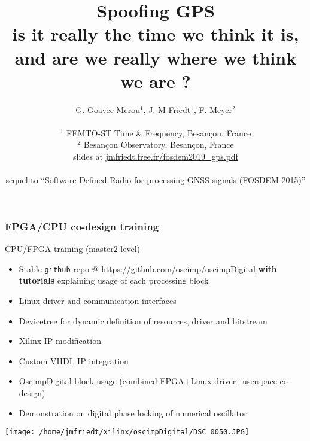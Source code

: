 \documentclass[compress,10pt]{beamer}
\title[FPGA]{Spoofing GPS \\
{
is it really the time we think it is, and are we really where we think we 
are ?}
 \vspace{0.2cm}}
\author[]{G. Goavec-Merou$^1$, J.-M Friedt$^1$, F. Meyer$^2$\\ \ \\
$^1$ FEMTO-ST Time \& Frequency, Besan\c con, France\\
$^2$ Besan\c con Observatory, Besan\c con, France\\
\vspace{0.3cm}
slides at \url{jmfriedt.free.fr/fosdem2019_gps.pdf}\\\ \\
sequel to ``Software Defined Radio for processing GNSS signals (FOSDEM 2015)''
}
\begin{document}
\begin{frame}\frametitle{FPGA/CPU co-design training}

CPU/FPGA training (master2 level)

\begin{itemize}
\item Stable {\tt github} repo @ \url{https://github.com/oscimp/oscimpDigital} {\bf with tutorials} explaining
usage of each processing block
\item Linux driver and communication interfaces
\item Devicetree for dynamic definition of resources, driver and bitstream
\item Xilinx IP modification
\item Custom VHDL IP integration
\item OscimpDigital block usage (combined FPGA+Linux driver+userspace co-design)
\item Demonstration on digital phase locking of numerical oscillator
\end{itemize}

\texttt{[image: /home/jmfriedt/xilinx/oscimpDigital/DSC\_0050.JPG]}
\end{frame}
\end{document}
